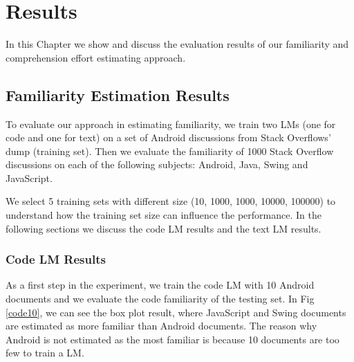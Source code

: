 \documentclass[12pt,mscthesis]{usiinfthesis}
\begin{document}
{\chapter{Results}
	In this Chapter we show and discuss the evaluation results of our familiarity and comprehension effort estimating approach.

\section{Familiarity Estimation Results}

To evaluate our approach in estimating familiarity, we train two LMs (one for code and one for text) on a set of Android discussions from Stack Overflows' dump (training set). Then we evaluate the familiarity of 1000 Stack Overflow discussions on each of the following subjects: Android, Java, Swing and JavaScript.

We select 5 training sets with different size (10, 1000, 1000, 10000, 100000) to understand how the training set size can influence the performance. In the following sections we discuss the code LM results and the text LM results.

\subsection{Code LM Results}
  As a first step in the experiment, we train the code LM with 10 Android documents and we evaluate the code familiarity of the testing set. In Fig \ref{code10}, we can see the box plot result, where JavaScript and Swing documents are estimated as more familiar than Android documents. The reason why Android is not estimated as the most familiar is because 10 documents are too few to train a LM. 

	







}
\end{document}
